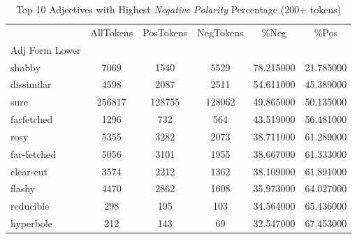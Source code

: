 

\singlespacing
\scriptsize\noindent
\begin{table}
\centering
\caption{Top 10 Adjectives with Highest \textit{Negative Polarity} Percentage (200+ tokens)}
\label{tab:top10-adv-NegPercent}
\begin{tabular}{*{1}{l}S[table-auto-round, table-format=7.2, drop-zero-decimal]
    S[table-auto-round, table-format=7.2, drop-zero-decimal]
    S[table-auto-round, table-format=7.2, drop-zero-decimal]
    S[table-auto-round, table-format=7.2, drop-zero-decimal]
    S[table-auto-round, table-format=7.2, drop-zero-decimal]}
\toprule
{} & {AllTokens} & {PosTokens} & {NegTokens} & {\%Neg} & {\%Pos} \\
{Adj Form Lower} & {} & {} & {} & {} & {} \\
\midrule
shabby & 7069 & 1540 & 5529 & 78.215000 & 21.785000 \\
dissimilar & 4598 & 2087 & 2511 & 54.611000 & 45.389000 \\
sure & 256817 & 128755 & 128062 & 49.865000 & 50.135000 \\
farfetched & 1296 & 732 & 564 & 43.519000 & 56.481000 \\
rosy & 5355 & 3282 & 2073 & 38.711000 & 61.289000 \\
far-fetched & 5056 & 3101 & 1955 & 38.667000 & 61.333000 \\
clear-cut & 3574 & 2212 & 1362 & 38.109000 & 61.891000 \\
flashy & 4470 & 2862 & 1608 & 35.973000 & 64.027000 \\
reducible & 298 & 195 & 103 & 34.564000 & 65.436000 \\
hyperbole & 212 & 143 & 69 & 32.547000 & 67.453000 \\
\bottomrule
\end{tabular}
\end{table}

\normalsize
\normalspacing
